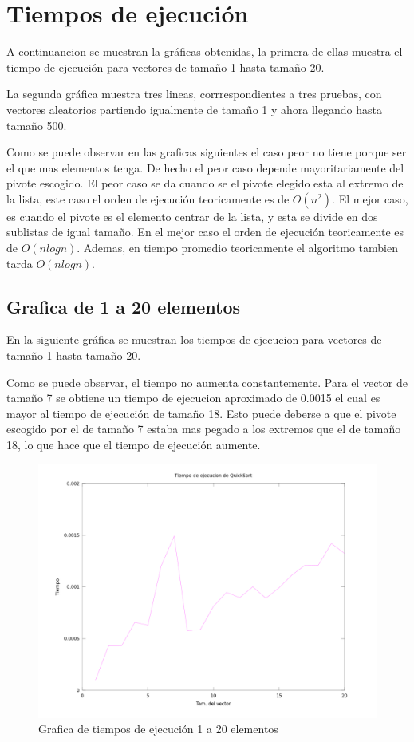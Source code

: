 \documentclass[a4,12pt]{article}
\begin{document}
\section{Tiempos de ejecución}
A continuancion se muestran la gráficas obtenidas, la primera de ellas muestra el tiempo de ejecución para vectores de tamaño 1 hasta tamaño 20.
 
 \medskip
La segunda gráfica muestra tres lineas, corrrespondientes a tres pruebas, con vectores aleatorios partiendo igualmente de tamaño 1 y ahora llegando hasta tamaño 500.
 
 \medskip
Como se puede observar en las graficas siguientes el caso peor no tiene porque ser el que mas elementos tenga. De hecho el peor caso depende mayoritariamente del pivote  escogido. El peor caso se da cuando se el pivote elegido esta al extremo de la lista, este caso el orden de ejecución teoricamente es de $O(n^2)$.
El mejor caso, es cuando el pivote es el elemento centrar de la lista, y esta se divide en dos sublistas de igual tamaño. En el mejor caso el orden de ejecución teoricamente es de $O(nlogn)$. Ademas, en tiempo promedio teoricamente el algoritmo tambien tarda $O(nlogn)$.
\newpage
\subsection{Grafica de 1 a 20 elementos}
En la siguiente gráfica se muestran los tiempos de ejecucion para vectores de tamaño 1 hasta tamaño 20.

Como se puede observar, el tiempo no aumenta constantemente. Para el vector de tamaño 7 se obtiene un tiempo de ejecucion aproximado de 0.0015 el cual es mayor al tiempo de ejecución de tamaño 18. Esto puede deberse a que el pivote escogido por el de tamaño 7 estaba mas pegado a los extremos que el de tamaño 18, lo que hace que el tiempo de ejecución aumente.
\begin{figure}[h]
\includegraphics[width=1\textwidth]{Graficos/Grafica20}
\caption{Grafica de tiempos de ejecución 1 a 20 elementos}
\label{fig:Grafica20}
\end{figure}
\newpage
\end{document}
